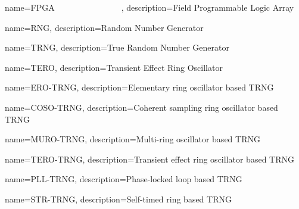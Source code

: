 {
    name=FPGA$\qquad\qquad\qquad\qquad$,
    description={Field Programmable Logic Array}
}

{
    name=RNG,
    description={Random Number Generator}
}

{
    name=TRNG,
    description={True Random Number Generator}
}

{
    name=TERO,
    description={Transient Effect Ring Oscillator}
}

{
    name=ERO-TRNG,
    description={Elementary ring oscillator based TRNG}
}

{
    name=COSO-TRNG,
    description={Coherent sampling ring oscillator based TRNG}
}

{
    name=MURO-TRNG,
    description={Multi-ring oscillator based TRNG}
}


{
    name=TERO-TRNG,
    description={Transient effect ring oscillator based TRNG}
}

{
    name=PLL-TRNG,
    description={Phase-locked loop based TRNG}
}


{
    name=STR-TRNG,
    description={Self-timed ring based TRNG}
}
